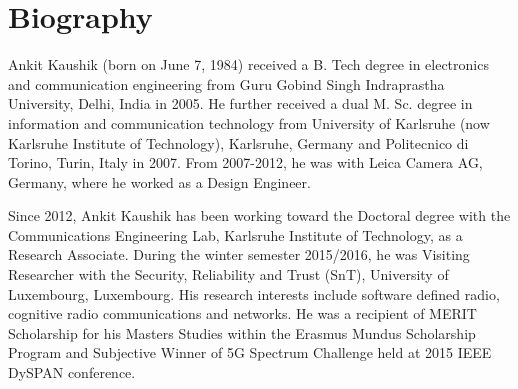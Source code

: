 \chapter*{Biography}


Ankit Kaushik (born on June 7, 1984) received a B. Tech degree in electronics and communication engineering from Guru Gobind Singh Indraprastha University, Delhi, India in 2005. He further received a dual M. Sc. degree in information and communication technology from University of Karlsruhe (now Karlsruhe Institute of Technology), Karlsruhe, Germany and Politecnico di Torino, Turin, Italy in 2007. From 2007-2012, he was with Leica Camera AG, Germany, where he worked as a Design Engineer. 

Since 2012, Ankit Kaushik has been working toward the Doctoral degree with the Communications Engineering Lab, Karlsruhe Institute of Technology, as a Research Associate. During the winter semester 2015/2016, he was Visiting Researcher with the Security, Reliability and Trust (SnT), University of Luxembourg, Luxembourg. His research interests include software defined radio, cognitive radio communications and networks. He was a recipient of MERIT Scholarship for his Masters Studies within the Erasmus Mundus Scholarship Program and Subjective Winner of 5G Spectrum Challenge held at 2015 IEEE DySPAN conference.

%
%
%	

